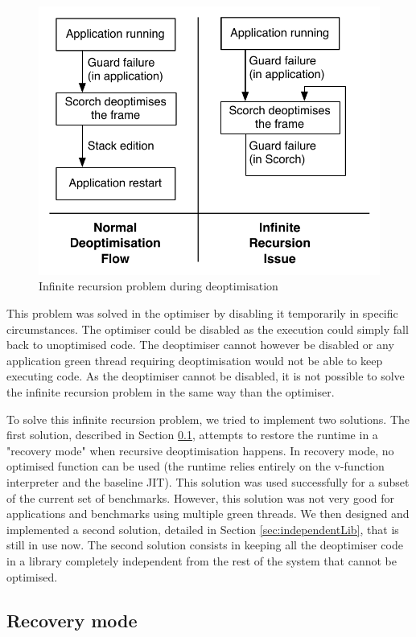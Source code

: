 \documentclass[a4paper,12pt,twoside]{../includes/ThesisStyle}
\begin{document}
\begin{figure}[h!]
    \begin{center}
        \includegraphics[width=0.65\linewidth]{InfiniteRecursionDeoptPb}
        \caption{Infinite recursion problem during deoptimisation}
        \label{fig:InfiniteRecursionDeoptPb}
    \end{center}
\end{figure}

This problem was solved in the optimiser by disabling it temporarily in specific circumstances. The optimiser could be disabled as the execution could simply fall back to unoptimised code. The deoptimiser cannot however be disabled or any application green thread requiring deoptimisation would not be able to keep executing code. As the deoptimiser cannot be disabled, it is not possible to solve the infinite recursion problem in the same way than the optimiser. 

To solve this infinite recursion problem, we tried to implement two solutions. The first solution, described in Section \ref{sec:recovery}, attempts to restore the runtime in a "recovery mode" when recursive deoptimisation happens. In recovery mode, no optimised function can be used (the runtime relies entirely on the v-function interpreter and the baseline JIT). This solution was used successfully for a subset of the current set of benchmarks. However, this solution was not very good for applications and benchmarks using multiple green threads. We then designed and implemented a second solution, detailed in Section \ref{sec:independentLib}, that is still in use now. The second solution consists in keeping all the deoptimiser code in a library completely independent from the rest of the system that cannot be optimised.

\subsection{Recovery mode}
\label{sec:recovery}
\end{document}
